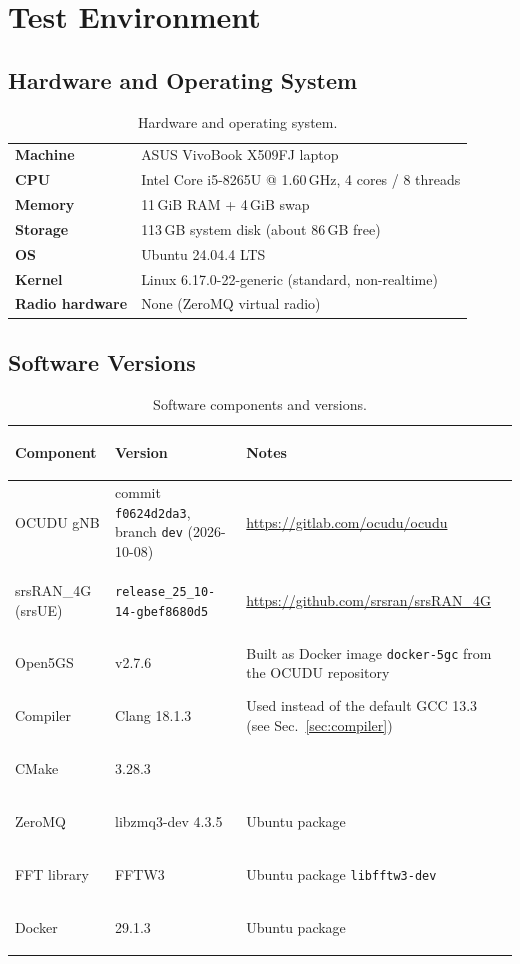 \documentclass[11pt,a4paper]{article}
\begin{document}
\section{Test Environment}

\subsection{Hardware and Operating System}

\begin{table}[H]
\centering
\begin{tabularx}{0.85\textwidth}{>{\bfseries}l X}
\toprule
Machine        & ASUS VivoBook X509FJ laptop \\
CPU            & Intel Core i5-8265U @ 1.60\,GHz, 4 cores / 8 threads \\
Memory         & 11\,GiB RAM + 4\,GiB swap \\
Storage        & 113\,GB system disk (about 86\,GB free) \\
OS             & Ubuntu 24.04.4 LTS \\
Kernel         & Linux 6.17.0-22-generic (standard, non-realtime) \\
Radio hardware & None (ZeroMQ virtual radio) \\
\bottomrule
\end{tabularx}
\caption{Hardware and operating system.}
\end{table}

\subsection{Software Versions}

\begin{table}[H]
\centering
\begin{tabularx}{\textwidth}{>{\bfseries\raggedright}p{3.1cm} >{\raggedright}p{5.4cm} >{\raggedright\arraybackslash}X}
\toprule
Component & Version & Notes \\
\midrule
OCUDU gNB      & commit \texttt{f0624d2da3}, branch \texttt{dev} (2026-10-08) & \url{https://gitlab.com/ocudu/ocudu} \\
srsRAN\_4G (srsUE) & \texttt{release\_25\_10-14-g\-bef8680d5} & \url{https://github.com/srsran/srsRAN_4G} \\
Open5GS        & v2.7.6 & Built as Docker image \texttt{docker-5gc} from the OCUDU repository \\
Compiler       & Clang 18.1.3 & Used instead of the default GCC 13.3 (see Sec.~\ref{sec:compiler}) \\
CMake          & 3.28.3 & \\
ZeroMQ         & libzmq3-dev 4.3.5 & Ubuntu package \\
FFT library    & FFTW3 & Ubuntu package \texttt{libfftw3-dev} \\
Docker         & 29.1.3 & Ubuntu package \\
\bottomrule
\end{tabularx}
\caption{Software components and versions.}
\end{table}
\end{document}
